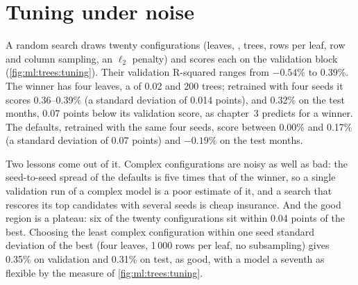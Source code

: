 \section{Tuning under noise}

A random search draws twenty configurations (leaves, , trees, rows per leaf, row and column sampling, an
$\ell_2$ penalty) and scores each on the validation block (\cref{fig:ml:trees:tuning}). Their validation R-squared
ranges from $-0.54\%$ to 0.39\%. The winner has four leaves, a  of 0.02 and 200 trees; retrained with four
seeds it scores 0.36--0.39\% (a standard deviation of 0.014 points), and 0.32\% on the test months, 0.07 points below its
validation score, as chapter~3 predicts for a winner. The defaults, retrained with the same four seeds, score between
0.00\% and 0.17\% (a standard deviation of 0.07 points) and $-0.19\%$ on the test months.

Two lessons come out of it. Complex configurations are noisy as well as bad: the seed-to-seed spread of the defaults is
five times that of the winner, so a single validation run of a complex model is a poor estimate of it, and a search that
rescores its top candidates with several seeds is cheap insurance. And the good region is a plateau: six of the
twenty configurations sit within 0.04 points of the best. Choosing the least complex configuration within one seed
standard deviation of the best (four leaves, 1\,000 rows per leaf, no subsampling) gives 0.35\% on validation and 0.31\%
on test, as good, with a model a seventh as flexible by the measure of \cref{fig:ml:trees:tuning}.


